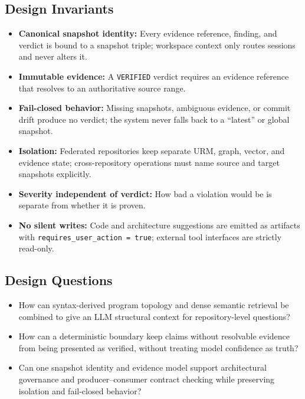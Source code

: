 \documentclass[runningheads]{llncs}
\begin{document}
\subsection{Design Invariants}
\begin{itemize}
    \item[\textbf{I1}] \textbf{Canonical snapshot identity:} Every evidence reference, finding, and verdict is bound to a snapshot triple; workspace context only routes sessions and never alters it.
    \item[\textbf{I2}] \textbf{Immutable evidence:} A \texttt{VERIFIED} verdict requires an evidence reference that resolves to an authoritative source range.
    \item[\textbf{I3}] \textbf{Fail-closed behavior:} Missing snapshots, ambiguous evidence, or commit drift produce no verdict; the system never falls back to a ``latest'' or global snapshot.
    \item[\textbf{I4}] \textbf{Isolation:} Federated repositories keep separate URM, graph, vector, and evidence state; cross-repository operations must name source and target snapshots explicitly.
    \item[\textbf{I5}] \textbf{Severity independent of verdict:} How bad a violation would be is separate from whether it is proven.
    \item[\textbf{I6}] \textbf{No silent writes:} Code and architecture suggestions are emitted as artifacts with \texttt{requires\_user\_action = true}; external tool interfaces are strictly read-only.
\end{itemize}

\subsection{Design Questions}
\begin{itemize}
    \item[\textbf{DQ1.}] How can syntax-derived program topology and dense semantic retrieval be combined to give an LLM structural context for repository-level questions?
    \item[\textbf{DQ2.}] How can a deterministic boundary keep claims without resolvable evidence from being presented as verified, without treating model confidence as truth?
    \item[\textbf{DQ3.}] Can one snapshot identity and evidence model support architectural governance and producer--consumer contract checking while preserving isolation and fail-closed behavior?
\end{itemize}
\end{document}
